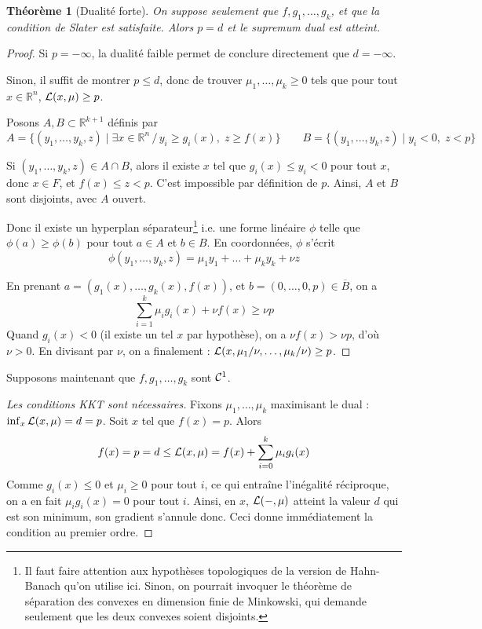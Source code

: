 \documentclass[a4paper, 11pt]{article}
\def\R{\mathbb{R}}
\def\L{{\cal{L}}}
\def\Cf{{\cal{C}}}
\newtheorem*{theorem}{Théorème}
\begin{document}
\begin{theorem}[Dualité forte]
  On suppose seulement que $f, g_1, \ldots, g_k$, et que la condition de Slater
  est satisfaite. Alors $p = d$ et le supremum dual est atteint.
\end{theorem}
\begin{proof}
  Si $p = -\infty$, la dualité faible permet de conclure directement que $d =
  -\infty$.
  
  Sinon, il suffit de montrer $p \leq d$, donc de trouver $\mu_1, \ldots, \mu_k
  \geq 0$ tels que pour tout $x \in \R^n$, $\L(x,\mu) \geq p$.

  Posons $A, B \subset \R^{k+1}$ définis par
  \[ A = \{ (y_1, \ldots, y_k, z) \mid \exists x \in \R^n\,/\,
    y_i \geq g_i(x),\; z \geq f(x) \}
    \qquad B = \{ (y_1, \ldots, y_k, z) \mid y_i < 0,\;z < p\}\]

  Si $(y_1,\ldots,y_k,z) \in A \cap B$, alors il existe $x$ tel que $g_i(x) \leq
  y_i < 0$ pour tout $x$, donc $x \in F$, et $f(x) \leq z < p$. C'est impossible
  par définition de $p$. Ainsi, $A$ et $B$ sont disjoints, avec $A$ ouvert.
  
  Donc il existe un hyperplan séparateur\footnote{Il faut faire attention aux
    hypothèses topologiques de la version de Hahn-Banach qu'on utilise ici.
    Sinon, on pourrait invoquer le théorème de séparation des convexes en
    dimension finie de Minkowski, qui demande seulement que les deux convexes
    soient disjoints.} i.e. une forme linéaire $\phi$ telle que $\phi(a) \geq
  \phi(b)$ pour tout $a \in A$ et $b \in B$. En coordonnées, $\phi$ s'écrit
  \[ \phi(y_1, \ldots, y_k, z) = \mu_1 y_1 + \ldots + \mu_k y_k + \nu z \]
  
  En prenant $a = (g_1(x), \ldots, g_k(x), f(x))$, et $b = (0, \ldots, 0, p) \in
  \overline{B}$, on a
  \[ \sum_{i=1}^k \mu_i g_i(x) + \nu f(x) \geq \nu p \]
  Quand $g_i(x) < 0$ (il existe un tel $x$ par hypothèse), on a $\nu f(x) > \nu
  p$, d'où $\nu > 0$. En divisant par $\nu$, on a finalement :
  $\L(x, \mu_1/\nu, \ldots, \mu_k/\nu) \geq p$.
\end{proof}

Supposons maintenant que $f, g_1, \ldots, g_k$ sont $\Cf^1$. 
\begin{proof}[Les conditions KKT sont nécessaires]
  Fixons $\mu_1, \ldots, \mu_k$ maximisant le dual : $\inf_x \L(x, \mu) = d =
  p$. Soit $x$ tel que $f(x) = p$. Alors
  \[ f(x) = p = d \leq \L(x, \mu) = f(x) + \sum_{i=0}^k \mu_i g_i(x) \] Comme
  $g_i(x) \leq 0$ et $\mu_i \geq 0$ pour tout $i$, ce qui entraîne l'inégalité
  réciproque, on a en fait $\mu_i g_i(x) = 0$ pour tout $i$. Ainsi, en $x$,
  $\L(-, \mu)$ atteint la valeur $d$ qui est son minimum, son gradient s'annule
  donc. Ceci donne immédiatement la condition au premier ordre.
\end{proof}
\end{document}
